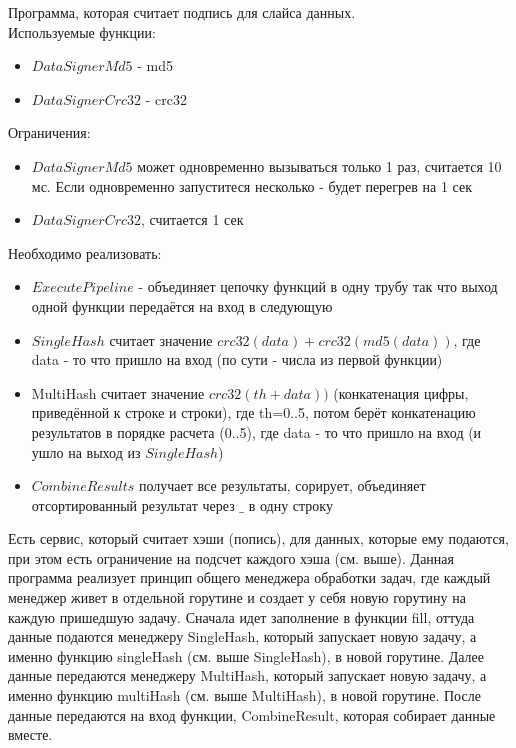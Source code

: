\documentclass[utf8x, 12pt]{G7-32} %
\begin{document}
Программа, которая считает подпись для слайса данных.
\\
Используемые функции:
\begin{itemize}
	\item $DataSignerMd5$ - md5
	\item $DataSignerCrc32$ - crc32
\end{itemize}
Ограничения:
\begin{itemize}
	\item $DataSignerMd5$ может одновременно вызываться только 1 раз, считается 10 мс. Если одновременно запуститеся несколько - будет перегрев на 1 сек
	\item $DataSignerCrc32$, считается 1 сек
\end{itemize}
Необходимо реализовать:
\begin{itemize}
	\item $ExecutePipeline$ - объединяет цепочку функций в одну трубу так что выход одной функции передаётся на вход в следующую
	\item $SingleHash$ считает значение $crc32(data)+crc32(md5(data))$, где data - то что пришло на вход (по сути - числа из первой функции)
	\item MultiHash считает значение $crc32(th+data))$ (конкатенация цифры, приведённой к строке и строки), где th=0..5, потом берёт конкатенацию результатов в порядке расчета (0..5), где data - то что пришло на вход (и ушло на выход из $SingleHash$)
	\item $CombineResults$ получает все результаты, сорирует, объединяет отсортированный результат через $\_$ в одну строку
\end{itemize}

Есть сервис, который считает хэши (попись), для данных, которые ему подаются, при этом есть ограничение на подсчет каждого хэша (см. выше). Данная программа реализует принцип общего менеджера обработки задач, где каждый менеджер живет в отдельной горутине и создает у себя новую горутину на каждую пришедшую задачу. Сначала идет заполнение в функции fill, оттуда данные подаются менеджеру SingleHash, который запускает новую задачу, а именно функцию singleHash (см. выше SingleHash), в новой горутине. Далее данные передаются менеджеру MultiHash, который запускает новую задачу, а именно функцию multiHash (см. выше MultiHash), в новой горутине. После данные передаются на вход функции, CombineResult, которая собирает данные вместе.

\newpage
\end{document}
